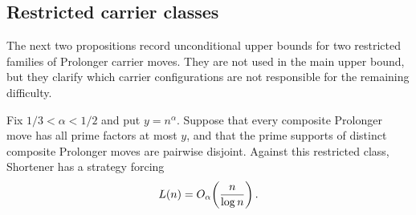 \subsection{Restricted carrier classes}\label{app:restricted-carriers}

The next two propositions record unconditional upper bounds for two restricted
families of Prolonger carrier moves.  They are not used in the main upper
bound, but they clarify which carrier configurations are not responsible for
the remaining difficulty.

\begin{proposition}
\label{prop:disjoint-carriers}
Fix $1/3<\alpha<1/2$ and put $y=n^\alpha$.  Suppose that every composite
Prolonger move has all prime factors at most $y$, and that the prime supports
of distinct composite Prolonger moves are pairwise disjoint.  Against this
restricted class, Shortener has a strategy forcing
\[
  L(n)=O_\alpha\!\left(\frac n{\log n}\right).
\]
\end{proposition}

